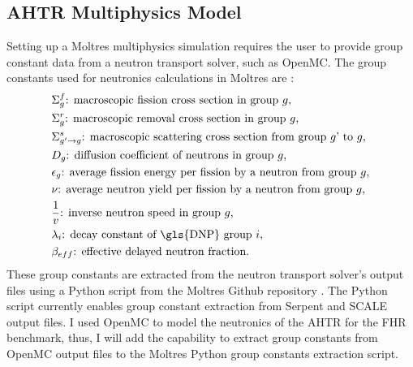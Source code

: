 \subsection{AHTR Multiphysics Model}
\label{sec:ahtr_multiphysics_model}
Setting up a Moltres multiphysics simulation requires the user to provide group 
constant data from a neutron transport solver, such as OpenMC. 
The group constants used for neutronics calculations in Moltres are 
\cite{lindsay_introduction_2018,park_advancement_2020}: 
\begin{align*}
  &\Sigma^f_{g} \text{: macroscopic fission cross section in group $g$,} \\
  &\Sigma^r_{g} \text{: macroscopic removal cross section in group $g$,} \\
  &\Sigma^s_{g' \rightarrow g} \text{: macroscopic scattering cross section
  from group $g$' to $g$,} \\
  &D_g \text{: diffusion coefficient of neutrons in group $g$,} \\
  &\epsilon_g \text{: average fission energy per fission by a neutron from
  group $g$,} \\
  &\nu \text{: average neutron yield per fission by a neutron from group
  $g$,} \\
  &\frac{1}{v} \text{: inverse neutron speed in group $g$,} \\
  &\lambda_i \text{: decay constant of \gls{DNP} group $i$,} \\
  &\beta_{eff} \text{: effective delayed neutron fraction.} 
\end{align*}
These group constants are extracted from the neutron transport solver's output files 
using a Python script from the Moltres Github repository \cite{lindsay_moltres_2017}. 
The Python script currently enables group constant extraction from Serpent 
\cite{leppanen_serpent_2014} and SCALE \cite{bucholz_scale:_1982} output files.
I used OpenMC to model the neutronics of the \gls{AHTR} for the \gls{FHR} benchmark, 
thus, I will add the capability to extract group constants from OpenMC output 
files to the Moltres Python group constants extraction script. 

